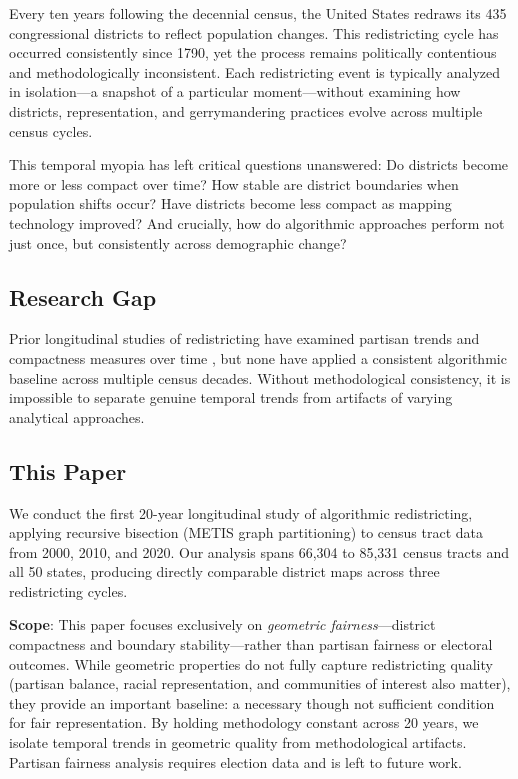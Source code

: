 
Every ten years following the decennial census, the United States redraws its 435 congressional districts to reflect population changes. This redistricting cycle has occurred consistently since 1790, yet the process remains politically contentious and methodologically inconsistent. Each redistricting event is typically analyzed in isolation—a snapshot of a particular moment—without examining how districts, representation, and gerrymandering practices evolve across multiple census cycles.

This temporal myopia has left critical questions unanswered: Do districts become more or less compact over time? How stable are district boundaries when population shifts occur? Have districts become less compact as mapping technology improved? And crucially, how do algorithmic approaches perform not just once, but consistently across demographic change?

\subsection{Research Gap}

Prior longitudinal studies of redistricting have examined partisan trends \citep{altman2011gerrymandering} and compactness measures over time \citep{henderson2018measuring}, but none have applied a consistent algorithmic baseline across multiple census decades. Without methodological consistency, it is impossible to separate genuine temporal trends from artifacts of varying analytical approaches.

\subsection{This Paper}

We conduct the first 20-year longitudinal study of algorithmic redistricting, applying recursive bisection (METIS graph partitioning) to census tract data from 2000, 2010, and 2020. Our analysis spans 66,304 to 85,331 census tracts and all 50 states, producing directly comparable district maps across three redistricting cycles.

\textbf{Scope}: This paper focuses exclusively on \textit{geometric fairness}—district compactness and boundary stability—rather than partisan fairness or electoral outcomes. While geometric properties do not fully capture redistricting quality (partisan balance, racial representation, and communities of interest also matter), they provide an important baseline: a necessary though not sufficient condition for fair representation. By holding methodology constant across 20 years, we isolate temporal trends in geometric quality from methodological artifacts. Partisan fairness analysis requires election data and is left to future work.


